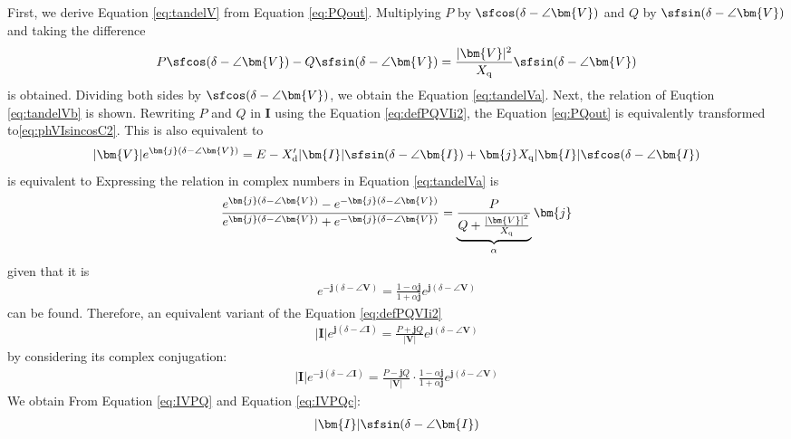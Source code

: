 \documentclass[tombow,dvipdfmx]{corona-a5-1.1}
\begin{document}
\begin{証明}
First, we derive Equation \ref{eq:tandelV} from Equation \ref{eq:PQout}.
Multiplying $P$ by $\sfcos (\delta - \angle \bm{V})$ and $Q$ by $\sfsin (\delta - \angle \bm{V})$ and taking the difference
\begin{align*}
P \sfcos (\delta - \angle \bm{V}) - Q \sfsin (\delta - \angle \bm{V})
= \frac{|\bm{V}|^2}{X_{\rm q}} \sfsin (\delta - \angle \bm{V}) 
\end{align*}
is obtained.
Dividing both sides by $\sfcos (\delta - \angle \bm{V})$, we obtain the Equation \ref{eq:tandelVa}.
Next, the relation of Euqtion \ref{eq:tandelVb} is shown.
Rewriting $P$ and $Q$ in $\bm{I}$ using the Equation \ref{eq:defPQVIi2}, the Equation \ref{eq:PQout} is equivalently transformed to\ref{eq:phVIsincosC2}.
This is also equivalent to
\begin{align}\label{eq:tmpVE}
|\bm{V}|e^{\bm{j}(\delta - \angle \bm{V})}=E
-X_{\rm d}' |\bm{I}| \sfsin (\delta - \angle \bm{I})
+ 
\bm{j} X_{\rm q} 
|\bm{I}| \sfcos (\delta - \angle \bm{I})
\end{align}
is equivalent to
Expressing the relation in complex numbers in Equation \ref{eq:tandelVa} is
\begin{align*}
\frac{ e^{\bm{j}(\delta - \angle \bm{V})} - e^{-\bm{j}(\delta - \angle \bm{V})}}
{e^{\bm{j}(\delta - \angle \bm{V})} + e^{-\bm{j}(\delta - \angle \bm{V})}}
= 
\underbrace{
\frac{P}{Q + \tfrac{ |\bm{V}|^2}{X_{\rm q}} }
}_{\alpha}
 \bm{j}
\end{align*}
given that it is
\begin{align*}
e^{-\bm{j}(\delta - \angle \bm{V})} = \frac{1-\alpha \bm{j}}{1+\alpha \bm{j}}
e^{\bm{j}(\delta - \angle \bm{V})}
\end{align*}
can be found.
Therefore, an equivalent variant of the Equation \ref{eq:defPQVIi2}
\begin{align}\label{eq:IVPQ}
|\bm{I}|e^{\bm{j}(\delta - \angle \bm{I})} = \frac{P+\bm{j}Q}{|\bm{V}|}  
e^{\bm{j}(\delta - \angle \bm{V})}
\end{align}
by considering its complex conjugation:
\begin{align}\label{eq:IVPQc}
|\bm{I}|e^{-\bm{j}(\delta - \angle \bm{I})} = \frac{P-\bm{j}Q}{|\bm{V}|}  
\cdot \frac{1-\alpha \bm{j}}{1+\alpha \bm{j}}
e^{\bm{j}(\delta - \angle \bm{V})}
\end{align}
We obtain
From Equation \ref{eq:IVPQ} and Equation \ref{eq:IVPQc}:
\begin{align*}
|\bm{I}| \sfsin (\delta - \angle \bm{I})

\end{align*}
\end{証明}
\end{document}
